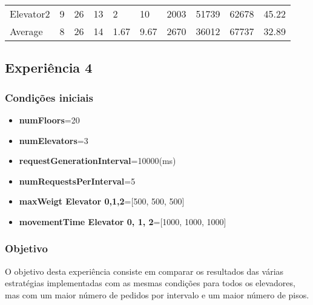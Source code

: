 \documentclass[a4paper]{article}
\begin{document}
\begin{table}[h]
\begin{tabular}{@{}llllllllll@{}}
Elevator2 & 9        & 26            & 13           & 2                                                               & 10                                                                  & 2003                                                         & 51739                                                 & 62678                                                   & 45.22         \\
Average   & 8     & 26         & 14        & 1.67                                                            & 9.67                                                               & 2670                                                         & 36012                                                 & 67737                                                   &  32.89         \\ \bottomrule
\end{tabular}
\end{table}

\subsection{Experiência 4}

\subsubsection{Condições iniciais}

\begin{itemize}
\item \textbf{numFloors}=20
\item \textbf{numElevators}=3
\item \textbf{requestGenerationInterval}=10000(ms)
\item \textbf{numRequestsPerInterval}=5
\item \textbf{maxWeigt Elevator 0,1,2}=[500, 500, 500]
\item \textbf{movementTime Elevator 0, 1, 2}=[1000, 1000, 1000]
\end{itemize}

\subsubsection{Objetivo} 

O objetivo desta experiência consiste em comparar os resultados das várias estratégias implementadas com as mesmas condições para todos os elevadores, mas com um maior número de pedidos por intervalo e um maior número de pisos.
\end{document}
